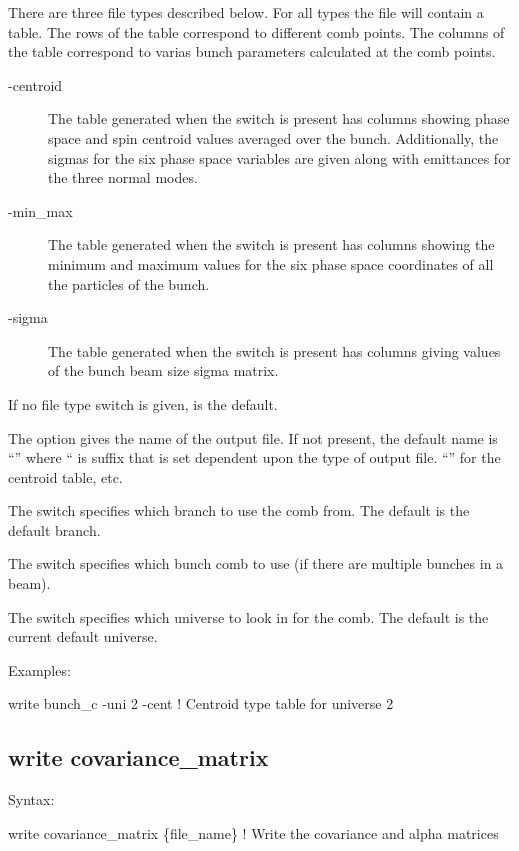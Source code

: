 {{{{{{{{{{{There are three file types described below. For all types the file will contain a table. The rows of
the table correspond to different comb points. The columns of the table correspond to varias bunch
parameters calculated at the comb points.
\begin{description}
\item[-centroid] \Newline
The table generated when the  switch is present has columns showing phase space and
spin centroid values averaged over the bunch. Additionally, the sigmas for the six phase space
variables are given along with emittances for the three normal modes.
%
\item[-min_max] \Newline
The table generated when the  switch is present has columns showing the minimum and
maximum values for the six phase space coordinates of all the particles of the bunch.
% 
\item[-sigma] \Newline 
The table generated when the  switch is present has columns giving values of the bunch
beam size sigma matrix.
\end{description}
If no file type switch is given,  is the default.

The  option gives the name of the output file. If not present, the default name is
``'' where `` is suffix that is set dependent upon the type of output
file. ``'' for the centroid table, etc.

The  switch specifies which branch to use the comb from. The default is the default
branch.

The  switch specifies which bunch comb to use (if there are multiple bunches in a beam).

The  switch specifies which universe to look in for the comb. The default is the
current default universe.

Examples:
\begin{example}
  write bunch_c -uni 2 -cent  ! Centroid type table for universe 2
\end{example}


\subsection{write covariance_matrix}
\label{s:write.covar.matrix}

Syntax:
\begin{example}
    write covariance_matrix \{file_name\}    ! Write the covariance and alpha matrices 
\end{example}

}}}}}}}}}}}
